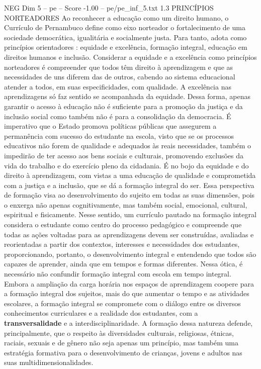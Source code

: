 \begin{textsample}{NEG Dim 5 – pe – Score -1.00 – pe/pe\_inf\_5.txt}  \label{ex:f5_neg_087}
1.3 PRINCÍPIOS NORTEADORES Ao reconhecer a educação como um direito humano, o Currículo de Pernambuco define como eixo norteador o fortalecimento de uma sociedade democrática, igualitária e socialmente justa.
Para tanto, adota como princípios orientadores : equidade e excelência, formação integral, educação em direitos humanos e inclusão.
Considerar a equidade e a excelência como princípios norteadores é compreender que todos têm direito à aprendizagem e que as necessidades de uns diferem das de outros, cabendo ao sistema educacional atender a todos, em suas especificidades, com qualidade.
A excelência nas aprendizagens só faz sentido se acompanhada da equidade.
Dessa forma, apenas garantir o acesso à educação não é suficiente para a promoção da justiça e da inclusão social como também não é para a consolidação da democracia.
É imperativo que o Estado promova políticas públicas que assegurem a permanência com sucesso do estudante na escola, visto que se os processos educativos não forem de qualidade e adequados às reais necessidades, também o impedirão de ter acesso aos bens sociais e culturais, promovendo exclusões da vida do trabalho e do exercício pleno da cidadania.
É no bojo da equidade e do direito à aprendizagem, com vistas a uma educação de qualidade e comprometida com a justiça e a inclusão, que se dá a formação integral do ser.
Essa perspectiva de formação visa ao desenvolvimento do sujeito em todas as suas dimensões, pois o enxerga não apenas cognitivamente, mas também social, emocional, cultural, espiritual e fisicamente.
Nesse sentido, um currículo pautado na formação integral considera o estudante como centro do processo pedagógico e compreende que todas as ações voltadas para as aprendizagens devem ser construídas, avaliadas e reorientadas a partir dos contextos, interesses e necessidades dos estudantes, proporcionando, portanto, o desenvolvimento integral e entendendo que todos são capazes de aprender, ainda que em tempos e formas diferentes.
Nessa ótica, é necessário não confundir formação integral com escola em tempo integral.
Embora a ampliação da carga horária nos espaços de aprendizagem coopere para a formação integral dos sujeitos, mais do que aumentar o tempo e as atividades escolares, a formação integral se compromete com o diálogo entre os diversos conhecimentos curriculares e a realidade dos estudantes, com a \textbf{transversalidade} e a interdisciplinaridade.
A formação dessa natureza defende, principalmente, que o respeito às diversidades culturais, religiosas, étnicas, raciais, sexuais e de gênero não seja apenas um princípio, mas também uma estratégia formativa para o desenvolvimento de crianças, jovens e adultos nas suas multidimensionalidades.

\end{textsample}
